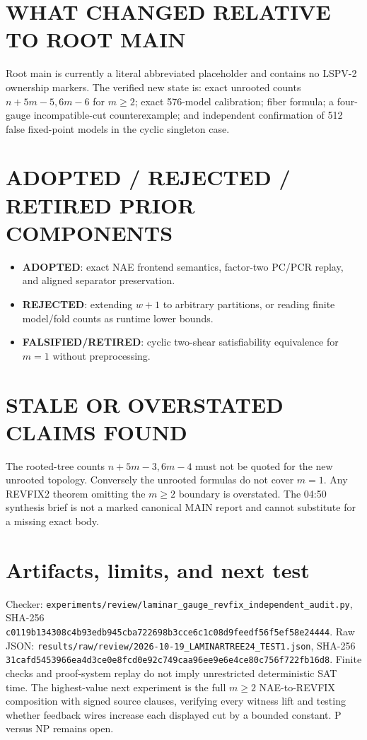 \documentclass[11pt]{article}
\newcommand{\status}[1]{\textbf{#1}}
\begin{document}
\section*{WHAT CHANGED RELATIVE TO ROOT MAIN}
Root main is currently a literal abbreviated placeholder and contains no LSPV-2 ownership markers.  The verified new state is: exact unrooted counts $n+5m-5,6m-6$ for $m\ge2$; exact 576-model calibration; fiber formula; a four-gauge incompatible-cut counterexample; and independent confirmation of 512 false fixed-point models in the cyclic singleton case.

\section*{ADOPTED / REJECTED / RETIRED PRIOR COMPONENTS}
\begin{itemize}
\item \status{ADOPTED}: exact NAE frontend semantics, factor-two PC/PCR replay, and aligned separator preservation.
\item \status{REJECTED}: extending $w+1$ to arbitrary partitions, or reading finite model/fold counts as runtime lower bounds.
\item \status{FALSIFIED/RETIRED}: cyclic two-shear satisfiability equivalence for $m=1$ without preprocessing.
\end{itemize}

\section*{STALE OR OVERSTATED CLAIMS FOUND}
The rooted-tree counts $n+5m-3,6m-4$ must not be quoted for the new unrooted topology.  Conversely the unrooted formulas do not cover $m=1$.  Any REVFIX2 theorem omitting the $m\ge2$ boundary is overstated.  The 04:50 synthesis brief is not a marked canonical MAIN report and cannot substitute for a missing exact body.

\section*{Artifacts, limits, and next test}
Checker: \texttt{experiments/review/laminar\_gauge\_revfix\_independent\_audit.py}, SHA-256 \texttt{c0119b134308c4b93edb945cba722698b3cce6c1c08d9feedf56f5ef58e24444}.  Raw JSON: \texttt{results/raw/review/2026-10-19\_LAMINARTREE24\_TEST1.json}, SHA-256 \texttt{31cafd5453966ea4d3ce0e8fcd0e92c749caa96ee9e6e4ce80c756f722fb16d8}.  Finite checks and proof-system replay do not imply unrestricted deterministic SAT time.  The highest-value next experiment is the full $m\ge2$ NAE-to-REVFIX composition with signed source clauses, verifying every witness lift and testing whether feedback wires increase each displayed cut by a bounded constant.  P versus NP remains open.

\end{document}

